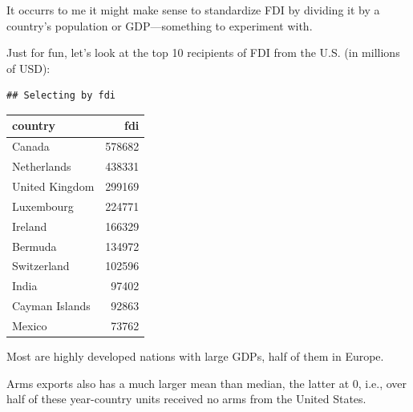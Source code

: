 \documentclass[12pt,]{article}
\newenvironment{Shaded}{\begin{snugshade}}{\end{snugshade}}
\newcommand{\DataTypeTok}[1]{\textcolor[rgb]{0.13,0.29,0.53}{#1}}
\newcommand{\DecValTok}[1]{\textcolor[rgb]{0.00,0.00,0.81}{#1}}
\newcommand{\KeywordTok}[1]{\textcolor[rgb]{0.13,0.29,0.53}{\textbf{#1}}}
\newcommand{\NormalTok}[1]{#1}
\newcommand{\OperatorTok}[1]{\textcolor[rgb]{0.81,0.36,0.00}{\textbf{#1}}}
\newcommand{\StringTok}[1]{\textcolor[rgb]{0.31,0.60,0.02}{#1}}
\begin{document}
It occurrs to me it might make sense to standardize FDI by dividing it
by a country's population or GDP---something to experiment with.

Just for fun, let's look at the top 10 recipients of FDI from the U.S.
(in millions of USD):

\begin{Shaded}
\end{Shaded}

\begin{verbatim}
## Selecting by fdi
\end{verbatim}

\begin{longtable}[]{@{}lr@{}}
\toprule
country & fdi\tabularnewline
\midrule
\endhead
Canada & 578682\tabularnewline
Netherlands & 438331\tabularnewline
United Kingdom & 299169\tabularnewline
Luxembourg & 224771\tabularnewline
Ireland & 166329\tabularnewline
Bermuda & 134972\tabularnewline
Switzerland & 102596\tabularnewline
India & 97402\tabularnewline
Cayman Islands & 92863\tabularnewline
Mexico & 73762\tabularnewline
\bottomrule
\end{longtable}

Most are highly developed nations with large GDPs, half of them in
Europe.

Arms exports also has a much larger mean than median, the latter at 0,
i.e., over half of these year-country units received no arms from the
United States.

\begin{Shaded}
\end{Shaded}
\end{document}
